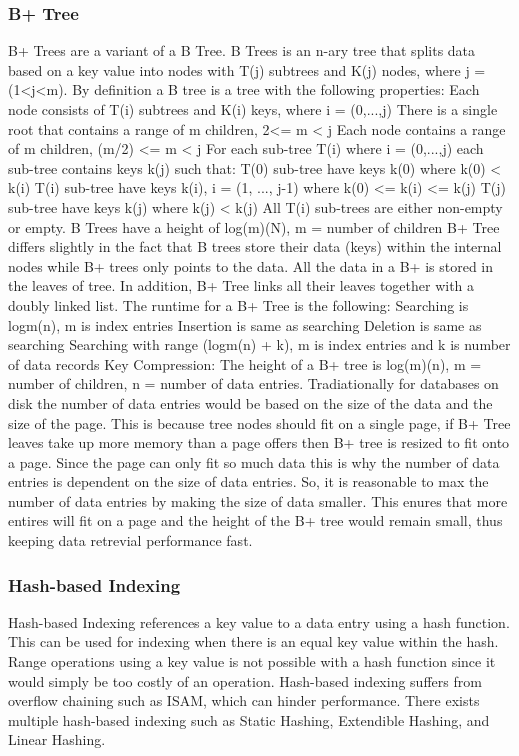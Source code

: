 \documentclass[letterpaper, 12pt]{article}
\begin{document}
\subsubsection{B+ Tree}
B+ Trees are a variant of a B Tree. B Trees is an n-ary tree that splits data
	based on a key value into nodes with T(j) subtrees and K(j) nodes, where j = (1<j<m).
	By definition a B tree is a tree with the following properties:
	Each node consists of T(i) subtrees and K(i) keys, where i = (0,...,j)
	There is a single root that contains a range of m children, 2<= m < j
	Each node contains a range of m children, (m/2) <= m < j
	For each sub-tree T(i) where i = (0,...,j) each sub-tree contains keys k(j) such that:
		T(0) sub-tree have keys k(0) where k(0) < k(i)
		T(i) sub-tree have keys k(i), i = (1, ..., j-1) where k(0) <= k(i) <= k(j)
		T(j) sub-tree have keys k(j) where k(j) < k(j)
	All T(i) sub-trees are either non-empty or empty.
	B Trees have a height of log(m)(N), m = number of children
B+ Tree differs slightly in the fact that B trees store their data (keys) within the internal nodes while 
B+ trees only points to the data. All the data in a B+ is stored in the leaves of tree. In addition, 
B+ Tree links all their leaves together with a doubly linked list.
The runtime for a B+ Tree is the following:
Searching is logm(n), m is index entries
Insertion is same as searching
Deletion is same as searching
Searching with range (logm(n) + k), m is index entries and k is number of data records
Key Compression:
The height of a B+ tree is log(m)(n), m = number of children, n = number of data entries.
Tradiationally for databases on disk the number of data entries would be based on the size of the data and
the size of the page. This is because tree nodes should fit on a single page, if B+ Tree leaves take up more 
memory than a page offers then B+ tree is resized to fit onto a page. Since the page can only fit so much 
data this is why the number of data entries is dependent on the size of data entries. So, it is reasonable 
to max the number of data entries by making the size of data smaller. This enures that more entires will 
fit on a page and the height of the B+ tree would remain small, thus keeping data retrevial performance fast.
\subsubsection{Hash-based Indexing}
	Hash-based Indexing references a key value to a data entry using a hash function. This can be 
	used for indexing when there is an equal key value within the hash. Range operations using 
	a key value is not possible with a hash function since it would simply be too costly of an 
	operation. Hash-based indexing suffers from overflow chaining such as ISAM, which can hinder 
	performance. There exists multiple hash-based indexing such as Static Hashing, Extendible Hashing, 
	and Linear Hashing. 
\end{document}
